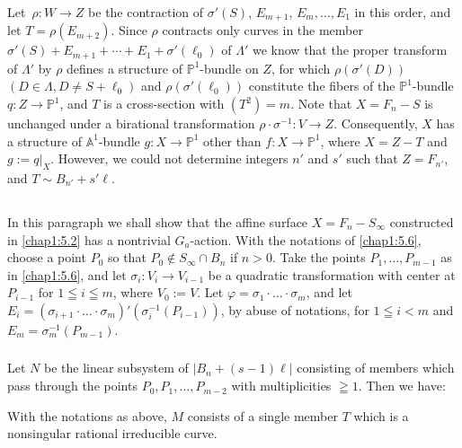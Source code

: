 \subsubsection{}\label{chap1:5.6.2}
Let\pageoriginale\ $\rho:W\to Z$ be the contraction of $\sigma'(S)$, $E_{m+1}$,
$E_{m},\ldots,E_{1}$ in this order, and let $T=\rho(E_{m+2})$. Since
$\rho$ contracts only curves in the member
$\sigma'(S)+E_{m+1}+\cdots+E_{1}+\sigma'(\ell_{0})$ of $\Lambda'$ we
know that the proper transform of $\Lambda'$ by $\rho$ defines a
structure of $\mathbb{P}^{1}$-bundle on $Z$, for which
$\rho(\sigma'(D))$ $(D\in \Lambda,D\neq S+\ell_{0})$ and
$\rho(\sigma'(\ell_{0}))$ constitute the fibers of the
$\mathbb{P}^{1}$-bundle $q:Z\to\mathbb{P}^{1}$, and $T$ is a
cross-section with $(T^{2})=m$. Note that $X=F_{n}-S$ is unchanged
under a birational transformation $\rho\cdot \sigma^{-1}:V\to
Z$. Consequently, $X$ has a structure of $\mathbb{A}^{1}$-bundle
$g:X\to \mathbb{P}^{1}$ other than $f:X\to \mathbb{P}^{1}$, where
$X=Z-T$ and $g:=q|_{X}$. However, we could not determine integers $n'$
and $s'$ such that $Z=F_{n'}$, and $T\sim B_{n'}+s'\ell$.

\subsection{}\label{chap1:5.7}
In this paragraph we shall show that the affine surface
$X=F_{n}-S_{\infty}$ constructed in \ref{chap1:5.2} has a nontrivial
$G_{a}$-action. With the notations of \ref{chap1:5.6}, choose a point
$P_{0}$ so that $P_{0}\not\in S_{\infty}\cap B_{n}$ if $n>0$. Take the
points $P_{1},\ldots,P_{m-1}$ as in \ref{chap1:5.6}, and let
$\sigma_{i}:V_{i}\to V_{i-1}$ be a quadratic transformation with
center at $P_{i-1}$ for $1\leqq i\leqq m$, where $V_{0}:=V$. Let
$\varphi=\sigma_{1}\cdot\ldots\cdot\sigma_{m}$, and let
$E_{i}=(\sigma_{i+1}\cdot\ldots\cdot\sigma_{m})'(\sigma^{-1}_{i}(P_{i-1}))$,
by abuse of notations, for $1\leqq i<m$ and
$E_{m}=\sigma^{-1}_{m}(P_{m-1})$. 

\subsubsection{}\label{chap1:5.7.1}
Let $N$ be the linear subsystem of $|B_{n}+(s-1)\ell|$ consisting of
members which pass through the points $P_{0},P_{1},\ldots,P_{m-2}$
with multiplicities $\geqq 1$. Then we have:

\begin{lemma*}
With the notations as above, $M$ consists of a single member $T$ which
is a nonsingular rational irreducible curve. 
\end{lemma*}

